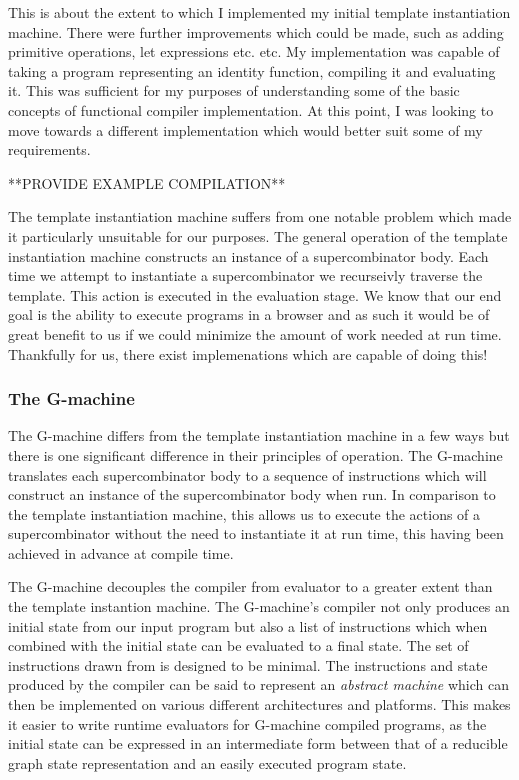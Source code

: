 \documentclass[11pt]{article}
\begin{document}
This is about the extent to which I implemented my initial
template instantiation machine. There were further 
improvements which could be made, such as adding primitive
operations, let expressions etc. etc. My implementation was
capable of taking a program representing an identity 
function, compiling it and evaluating it. This was 
sufficient for my purposes of understanding some of the
basic concepts of functional compiler implementation. At
this point, I was looking to move towards a different
implementation which would better suit some of my 
requirements.

**PROVIDE EXAMPLE COMPILATION**

The template instantiation machine suffers from one notable
problem which made it particularly unsuitable for our
purposes. The general operation of the template instantiation
machine constructs an instance of a supercombinator body.
Each time we attempt to instantiate a supercombinator we
recurseivly traverse the template. This action is executed
in the evaluation stage. We know that our end goal is the
ability to execute programs in a browser and as such it would
be of great benefit to us if we could minimize the amount of
work needed at run time. Thankfully for us, there exist
implemenations which are capable of doing this!

\subsubsection{The G-machine}
The G-machine differs from the template instantiation machine
in a few ways but there is one significant difference in 
their principles of operation. The G-machine translates each
supercombinator body to a sequence of instructions which will
construct an instance of the supercombinator body when run.
In comparison to the template instantiation machine, this
allows us to execute the actions of a supercombinator without
the need to instantiate it at run time, this having been
achieved in advance at compile time. 

The G-machine decouples the compiler from evaluator to a
greater extent than the template instantion machine. The
G-machine's compiler not only produces an initial state from
our input program but also a list of instructions which when
combined with the initial state can be evaluated to a final
state. The set of instructions drawn from is designed to be
minimal. The instructions and state produced
by the compiler can be said to represent an \emph{abstract
machine} which can then be implemented on various different
architectures and platforms. This makes it easier to write
runtime evaluators for G-machine compiled programs, as the
initial state can be expressed in an intermediate form 
between that of a reducible graph state representation 
and an easily executed program state.
\end{document}
